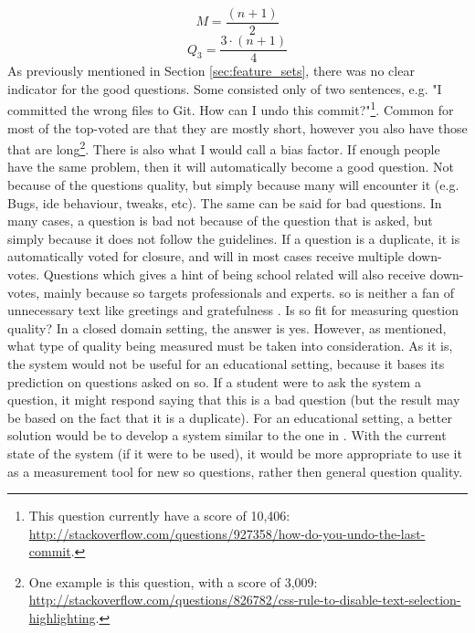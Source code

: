 \begin{equation}\label{eq:quartile2}
M = \frac{(n + 1)}{2}
\end{equation}
\begin{equation}\label{eq:quartile3}
Q_{3} = \frac{3 \cdot (n + 1)}{4}
\end{equation}
As previously mentioned in Section \ref{sec:feature_sets}, there was no clear indicator for the good questions. 
Some consisted only of two sentences, e.g. "I committed the wrong files to Git. How can I undo this commit?"\footnote{
	This question currently have a score of 10,406: \\ 
	\url{http://stackoverflow.com/questions/927358/how-do-you-undo-the-last-commit}.
}. Common for most of the top-voted are that they are mostly short, however you also have those that are long\footnote{
	One example is this question, with a score of 3,009: \\
	\url{http://stackoverflow.com/questions/826782/css-rule-to-disable-text-selection-highlighting}.
}.
There is also what I would call a bias factor. 
If enough people have the same problem, then it will automatically become a good question. 
Not because of the questions quality, but simply because many will encounter it (e.g. Bugs, \gls{ide} behaviour, tweaks, etc).
The same can be said for bad questions. 
In many cases, a question is bad not because of the question that is asked, but simply because it does not follow the guidelines. 
If a question is a duplicate, it is automatically voted for closure, and will in most cases receive multiple down-votes. 
Questions which gives a hint of being school related will also receive down-votes, mainly because \gls{so} targets professionals and experts. 
\gls{so} is neither a fan of unnecessary text like greetings and gratefulness \cite{CommunityWiki2016a,Heyer2012}.
\vspace{0.5em}\newline
Is \gls{so} fit for measuring question quality?
In a closed domain setting, the answer is yes. 
However, as mentioned, what type of quality being measured must be taken into consideration. 
As it is, the system would not be useful for an educational setting, because it bases its prediction on questions asked on \gls{so}.
If a student were to ask the system a question, it might respond saying that this is a bad question (but the result may be based on the fact that it is a duplicate).
For an educational setting, a better solution would be to develop a system similar to the one in \cite{Lezina2013}.
With the current state of the system (if it were to be used), it would be more appropriate to use it as a measurement tool for new \gls{so} questions, rather then general question quality.

